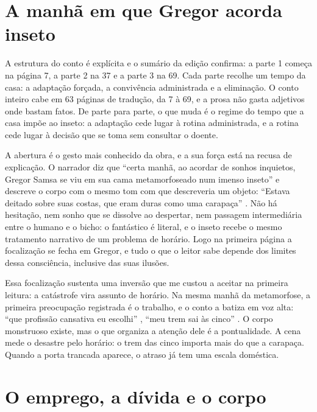 \documentclass[12pt]{article}
\begin{document}
\section{A manhã em que Gregor acorda inseto}

A estrutura do conto é explícita e o sumário da edição confirma: a parte 1 começa na página 7, a parte 2 na 37 e a parte 3 na 69. Cada parte recolhe um tempo da casa: a adaptação forçada, a convivência administrada e a eliminação. O conto inteiro cabe em 63 páginas de tradução, da 7 à 69, e a prosa não gasta adjetivos onde bastam fatos. De parte para parte, o que muda é o regime do tempo que a casa impõe ao inseto: a adaptação cede lugar à rotina administrada, e a rotina cede lugar à decisão que se toma sem consultar o doente.

A abertura é o gesto mais conhecido da obra, e a sua força está na recusa de explicação. O narrador diz que ``certa manhã, ao acordar de sonhos inquietos, Gregor Samsa se viu em sua cama metamorfoseado num imenso inseto'' \cite[p. 7]{kafka2022} e descreve o corpo com o mesmo tom com que descreveria um objeto: ``Estava deitado sobre suas costas, que eram duras como uma carapaça'' \cite[p. 7]{kafka2022}. Não há hesitação, nem sonho que se dissolve ao despertar, nem passagem intermediária entre o humano e o bicho: o fantástico é literal, e o inseto recebe o mesmo tratamento narrativo de um problema de horário. Logo na primeira página a focalização se fecha em Gregor, e tudo o que o leitor sabe depende dos limites dessa consciência, inclusive das suas ilusões.

Essa focalização sustenta uma inversão que me custou a aceitar na primeira leitura: a catástrofe vira assunto de horário. Na mesma manhã da metamorfose, a primeira preocupação registrada é o trabalho, e o conto a batiza em voz alta: ``que profissão cansativa eu escolhi'' \cite[p. 8]{kafka2022}, ``meu trem sai às cinco'' \cite[p. 10]{kafka2022}. O corpo monstruoso existe, mas o que organiza a atenção dele é a pontualidade. A cena mede o desastre pelo horário: o trem das cinco importa mais do que a carapaça. Quando a porta trancada aparece, o atraso já tem uma escala doméstica.

\section{O emprego, a dívida e o corpo}
\end{document}
